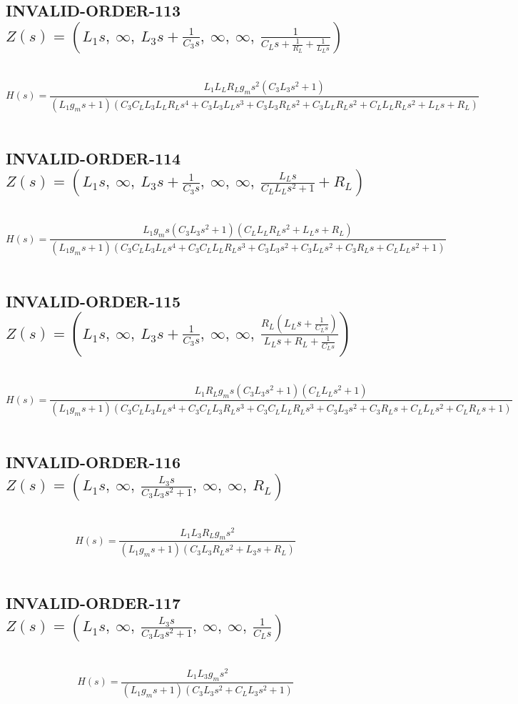 \documentclass{article}
\begin{document}
\subsection{INVALID-ORDER-113 $Z(s) = \left( L_{1} s, \  \infty, \  L_{3} s + \frac{1}{C_{3} s}, \  \infty, \  \infty, \  \frac{1}{C_{L} s + \frac{1}{R_{L}} + \frac{1}{L_{L} s}}\right)$ } \ 
\textbf{\[H(s) = \frac{L_{1} L_{L} R_{L} g_{m} s^{2} \left(C_{3} L_{3} s^{2} + 1\right)}{\left(L_{1} g_{m} s + 1\right) \left(C_{3} C_{L} L_{3} L_{L} R_{L} s^{4} + C_{3} L_{3} L_{L} s^{3} + C_{3} L_{3} R_{L} s^{2} + C_{3} L_{L} R_{L} s^{2} + C_{L} L_{L} R_{L} s^{2} + L_{L} s + R_{L}\right)}\] } \ 
\subsection{INVALID-ORDER-114 $Z(s) = \left( L_{1} s, \  \infty, \  L_{3} s + \frac{1}{C_{3} s}, \  \infty, \  \infty, \  \frac{L_{L} s}{C_{L} L_{L} s^{2} + 1} + R_{L}\right)$ } \ 
\textbf{\[H(s) = \frac{L_{1} g_{m} s \left(C_{3} L_{3} s^{2} + 1\right) \left(C_{L} L_{L} R_{L} s^{2} + L_{L} s + R_{L}\right)}{\left(L_{1} g_{m} s + 1\right) \left(C_{3} C_{L} L_{3} L_{L} s^{4} + C_{3} C_{L} L_{L} R_{L} s^{3} + C_{3} L_{3} s^{2} + C_{3} L_{L} s^{2} + C_{3} R_{L} s + C_{L} L_{L} s^{2} + 1\right)}\] } \ 
\subsection{INVALID-ORDER-115 $Z(s) = \left( L_{1} s, \  \infty, \  L_{3} s + \frac{1}{C_{3} s}, \  \infty, \  \infty, \  \frac{R_{L} \left(L_{L} s + \frac{1}{C_{L} s}\right)}{L_{L} s + R_{L} + \frac{1}{C_{L} s}}\right)$ } \ 
\textbf{\[H(s) = \frac{L_{1} R_{L} g_{m} s \left(C_{3} L_{3} s^{2} + 1\right) \left(C_{L} L_{L} s^{2} + 1\right)}{\left(L_{1} g_{m} s + 1\right) \left(C_{3} C_{L} L_{3} L_{L} s^{4} + C_{3} C_{L} L_{3} R_{L} s^{3} + C_{3} C_{L} L_{L} R_{L} s^{3} + C_{3} L_{3} s^{2} + C_{3} R_{L} s + C_{L} L_{L} s^{2} + C_{L} R_{L} s + 1\right)}\] } \ 
\subsection{INVALID-ORDER-116 $Z(s) = \left( L_{1} s, \  \infty, \  \frac{L_{3} s}{C_{3} L_{3} s^{2} + 1}, \  \infty, \  \infty, \  R_{L}\right)$ } \ 
\textbf{\[H(s) = \frac{L_{1} L_{3} R_{L} g_{m} s^{2}}{\left(L_{1} g_{m} s + 1\right) \left(C_{3} L_{3} R_{L} s^{2} + L_{3} s + R_{L}\right)}\] } \ 
\subsection{INVALID-ORDER-117 $Z(s) = \left( L_{1} s, \  \infty, \  \frac{L_{3} s}{C_{3} L_{3} s^{2} + 1}, \  \infty, \  \infty, \  \frac{1}{C_{L} s}\right)$ } \ 
\textbf{\[H(s) = \frac{L_{1} L_{3} g_{m} s^{2}}{\left(L_{1} g_{m} s + 1\right) \left(C_{3} L_{3} s^{2} + C_{L} L_{3} s^{2} + 1\right)}\] } \ 
\end{document}
